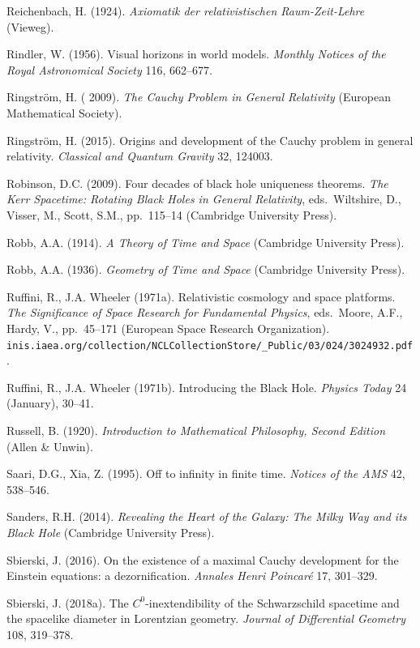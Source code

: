 \documentclass[12pt]{article}
\begin{document}
\begin{small}
\begin{thebibliography}{99}
      \item[]  Reichenbach, H. (1924). \emph{Axiomatik der relativistischen Raum-Zeit-Lehre} (Vieweg). 
       \item[]  Rindler, W. (1956). Visual horizons in world models. \emph{Monthly Notices of the Royal Astronomical
Society} 116,  662--677.
      \item[]  Ringstr\"{o}m, H.  ( 2009). \emph{The Cauchy Problem in General Relativity} (European Mathematical Society). 
      \item[]  Ringstr\"{o}m, H. (2015). Origins and development of the Cauchy problem in general relativity.
\emph{Classical and Quantum Gravity} 32, 124003.
 \item[] Robinson, D.C. (2009). Four decades of black hole uniqueness theorems. \emph{The Kerr Spacetime: Rotating Black Holes in General Relativity}, eds.\ Wiltshire, D., Visser, M., Scott, S.M., pp.\ 115--14 (Cambridge University Press).
 \item[]  Robb, A.A. (1914).   \emph{A Theory  of Time and Space} (Cambridge University Press). 
 \item[]  Robb, A.A. (1936). \emph{Geometry of Time and Space} (Cambridge University Press). 
       \item[] Ruffini, R.,  J.A. Wheeler (1971a). Relativistic cosmology and space platforms.
     \emph{The Significance
of Space Research for Fundamental Physics}, eds.\  Moore, A.F.,  Hardy, V., pp.\
45--171 (European Space Research Organization). \verb#inis.iaea.org/collection/NCLCollectionStore/_Public/03/024/3024932.pdf#.
         \item[] Ruffini, R.,  J.A. Wheeler (1971b).  Introducing the Black Hole. \emph{Physics Today} 24
(January), 30--41.
        \item[] Russell, B. (1920). \emph{Introduction to Mathematical Philosophy, Second Edition} (Allen \& Unwin).
         \item[] Saari, D.G., Xia, Z.  (1995). Off to infinity in finite time. \emph{Notices of the AMS} 42, 538--546. 
        \item[] Sanders, R.H. (2014). \emph{Revealing the Heart of the Galaxy: The Milky Way and its Black Hole} (Cambridge University Press).      
\item[] Sbierski, J. (2016). On the existence of a maximal Cauchy development for the Einstein equations: a dezornification.
\emph{Annales Henri Poincar\'{e}} 17, 301--329. 
\item[] Sbierski, J. (2018a). The $C^0$-inextendibility of the Schwarzschild spacetime and the spacelike diameter in Lorentzian geometry. \emph{Journal of Differential Geometry}  108, 319--378. 

\end{thebibliography}
\end{small}
\end{document}
